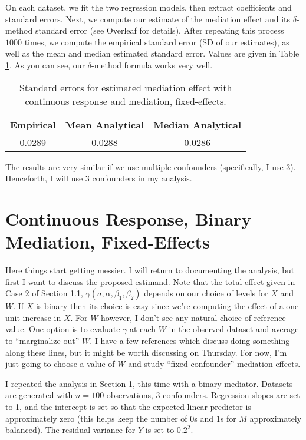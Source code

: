 \documentclass{article}
\begin{document}
On each dataset, we fit the two regression models, then extract coefficients and standard errors. Next, we compute our estimate of the mediation effect and its $\delta$-method standard error (see Overleaf for details). After repeating this process $1000$ times, we compute the empirical standard error (SD of our estimates), as well as the mean and median estimated standard error. Values are given in Table \ref{tab:SEs_cont_fix}. As you can see, our $\delta$-method formula works very well.

\begin{table}
    \centering
    \begin{tabular}{|c|c|c|}
        \hline
        Empirical & Mean Analytical & Median Analytical\\
        \hline
        0.0289 & 0.0288 & 0.0286\\
        \hline
    \end{tabular}
    \caption{Standard errors for estimated mediation effect with continuous response and mediation, fixed-effects.}
    \label{tab:SEs_cont_fix}
\end{table}

The results are very similar if we use multiple confounders (specifically, I use 3). Henceforth, I will use 3 confounders in my analysis.

\section{Continuous Response, Binary Mediation, Fixed-Effects}

Here things start getting messier. I will return to documenting the analysis, but first I want to discuss the proposed estimand. Note that the total effect given in Case 2 of Section 1.1, $\gamma(a, \alpha, \beta_1, \beta_2)$ depends on our choice of levels for $X$ and $W$. If $X$ is binary then its choice is easy since we're computing the effect of a one-unit increase in $X$. For $W$ however, I don't see any natural choice of reference value. One option is to evaluate $\gamma$ at each $W$ in the observed dataset and average to ``marginalize out'' $W$. I have a few references which discuss doing something along these lines, but it might be worth discussing on Thursday. For now, I'm just going to choose a value of $W$ and study ``fixed-confounder'' mediation effects.


I repeated the analysis in Section \ref{tab:SEs_cont_fix}, this time with a binary mediator. Datasets are generated with $n=100$ observations, 3 confounders. Regression slopes are set to 1, and the intercept is set so that the expected linear predictor is approximately zero (this helps keep the number of 0s and 1s for $M$ approximately balanced). The residual variance for $Y$ is set to $0.2^2$.
\end{document}
